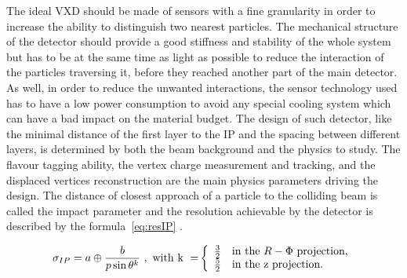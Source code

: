    
   The ideal \gls{VXD} should be made of sensors with a fine granularity in order to increase the ability to distinguish two nearest particles.
   The mechanical structure of the detector should provide a good stiffness and stability of the whole system but has to be at the same time as light as possible to reduce the interaction of the particles traversing it, before they reached another part of the main detector.
   As well, in order to reduce the unwanted interactions, the sensor technology used has to have a low power consumption to avoid any special cooling system which can have a bad impact on the material budget.
   The design of such detector, like the minimal distance of the first layer to the \gls{IP} and the spacing between different layers, is determined by both the beam background and the physics to study.
   The flavour tagging ability, the vertex charge measurement and tracking, and the displaced vertices reconstruction are the main physics parameters driving the design.
   The distance of closest approach of a particle to the colliding beam is called the impact parameter and the resolution achievable by the detector is described by the formula~\ref{eq:resIP} \cite{Battaglia2011}.
    
    \begin{equation}
      \sigma_{IP} = a \oplus \frac{b}{p \sin{\theta}^{k}}~\rm{,~with~k~=}
      \left\{
        \begin{array}{r l}
          \frac{3}{2} & \text{in the } R - \Phi \text{ projection,} \\
          \frac{5}{2} & \text{in the z projection.}
        \end{array}
      \right. 
      \label{eq:resIP}
    \end{equation}

